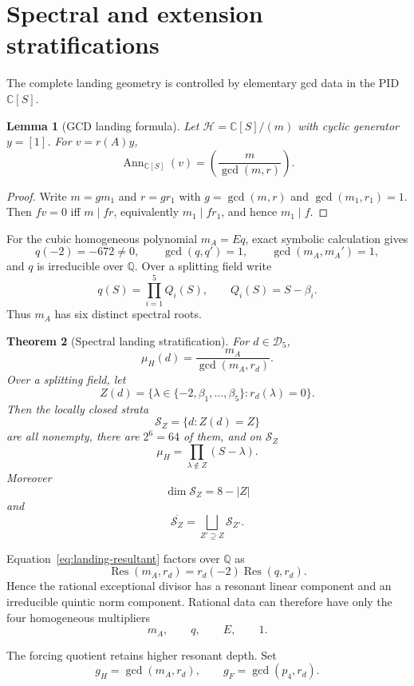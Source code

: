 \documentclass[11pt]{amsart}
\newtheorem{theorem}{Theorem}[section]
\newtheorem{lemma}[theorem]{Lemma}
\newcommand{\C}{\mathbb C}
\newcommand{\Q}{\mathbb Q}
\begin{document}
\section{Spectral and extension stratifications}\label{sec:stratification}

The complete landing geometry is controlled by elementary gcd data in the PID $\C[S]$.

\begin{lemma}[GCD landing formula]\label{lem:gcd-landing}
Let $\mathcal H=\C[S]/(m)$ with cyclic generator $y=[1]$.  For $v=r(A)y$,
\[
\boxed{
\operatorname{Ann}_{\C[S]}(v)=\left(\frac{m}{\gcd(m,r)}\right).
}
\]
\end{lemma}

\begin{proof}
Write $m=gm_1$ and $r=gr_1$ with $g=\gcd(m,r)$ and $\gcd(m_1,r_1)=1$.  Then $fv=0$ iff $m\mid fr$, equivalently $m_1\mid fr_1$, and hence $m_1\mid f$.
\end{proof}

For the cubic homogeneous polynomial $m_A=Eq$, exact symbolic calculation gives
\[
q(-2)=-672\neq0,
\qquad
\gcd(q,q')=1,
\qquad
\gcd(m_A,m_A')=1,
\]
and $q$ is irreducible over $\Q$.  Over a splitting field write
\[
q(S)=\prod_{i=1}^5Q_i(S),
\qquad
Q_i(S)=S-\beta_i.
\]
Thus $m_A$ has six distinct spectral roots.

\begin{theorem}[Spectral landing stratification]\label{thm:spectral-stratification}
For $d\in\mathscr D_5$,
\[
\boxed{
\mu_H(d)=\frac{m_A}{\gcd(m_A,r_d)}.
}
\]
Over a splitting field, let
\[
Z(d)=\{\lambda\in\{-2,\beta_1,\ldots,\beta_5\}:r_d(\lambda)=0\}.
\]
Then the locally closed strata
\[
\mathscr S_Z=\{d:Z(d)=Z\}
\]
are all nonempty, there are $2^6=64$ of them, and on $\mathscr S_Z$
\[
\boxed{
\mu_H=\prod_{\lambda\notin Z}(S-\lambda).
}
\]
Moreover
\[
\dim\mathscr S_Z=8-|Z|
\]
and
\[
\overline{\mathscr S_Z}
=\bigsqcup_{Z'\supseteq Z}\mathscr S_{Z'}.
\]
\end{theorem}

Equation~\eqref{eq:landing-resultant} factors over $\Q$ as
\[
\operatorname{Res}(m_A,r_d)
=r_d(-2)\operatorname{Res}(q,r_d).
\]
Hence the rational exceptional divisor has a resonant linear component and an irreducible quintic norm component.  Rational data can therefore have only the four homogeneous multipliers
\[
m_A,
\qquad q,
\qquad E,
\qquad1.
\]

The forcing quotient retains higher resonant depth.  Set
\[
g_H=\gcd(m_A,r_d),
\qquad
g_F=\gcd(p_4,r_d).
\]
\end{document}
